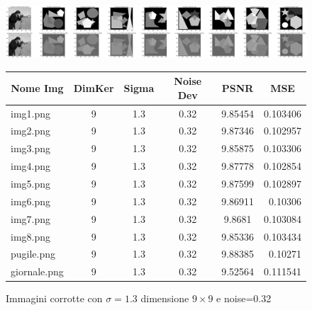 \begin{figure}[H]
    \centering
    \begin{minipage}[h]{\textwidth}
    \includegraphics[width=\linewidth]{output/tabCorrotte/imgcorr15.png}\label{fig:imgcorrotte9x90.32}
    \end{minipage}
    \begin{minipage}[h]{\textwidth}
        \centering
        
        \begin{tabular}{|l c c c c r|}
            \hline
            \multicolumn{1}{|c}{\textbf{Nome Img}} & \multicolumn{1}{|c}{\textbf{DimKer}} & \multicolumn{1}{|c}{\textbf{Sigma}} & \multicolumn{1}{|c}{\textbf{Noise Dev}} & \multicolumn{1}{|c}{\textbf{PSNR}} & \multicolumn{1}{|c|}{\textbf{MSE}} \\ \hline
                img1.png & 9 & 1.3 & 0.32 & 9.85454 & 0.103406 \\
                img2.png & 9 & 1.3 & 0.32 & 9.87346 & 0.102957 \\
                img3.png & 9 & 1.3 & 0.32 & 9.85875 & 0.103306 \\
                img4.png & 9 & 1.3 & 0.32 & 9.87778 & 0.102854 \\
                img5.png & 9 & 1.3 & 0.32 & 9.87599 & 0.102897 \\
                img6.png & 9 & 1.3 & 0.32 & 9.86911 & 0.10306 \\ 
                img7.png & 9 & 1.3 & 0.32 & 9.8681 & 0.103084 \\ 
                img8.png & 9 & 1.3 & 0.32 & 9.85336 & 0.103434 \\
                pugile.png & 9 & 1.3 & 0.32 & 9.88385 & 0.10271 \\
                giornale.png & 9 & 1.3 & 0.32 & 9.52564 & 0.111541 \\ \hline
            \end{tabular}\label{tab:tabcorrotte9x90.32}
        
        \end{minipage}
    \captionsetup{labelformat=andtable}
    \caption{Immagini corrotte con $\sigma = 1.3$ dimensione $9 \times 9$ e noise=0.32}
\end{figure}

